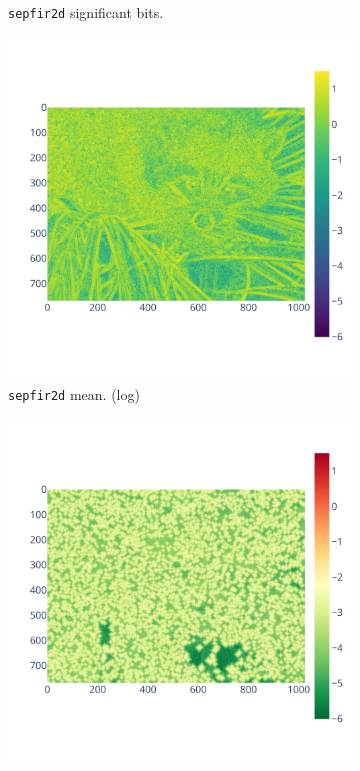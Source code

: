 \documentclass[11pt]{article}
\begin{document}
\begin{figure}
\begin{subfigure}{0.3\linewidth}
    \caption{\centering\texttt{sepfir2d} significant bits. \newline \textcolor{white}{.}}
    \label{fig:bspline_bisplev_sig}
\end{subfigure}
\begin{subfigure}{0.3\linewidth}
    \includegraphics[width=\linewidth]{figure/bspline/bspline_mean_log.pdf}
    \caption{\centering\texttt{sepfir2d} mean. \newline (log)}
    \label{fig:bspline_bisplev_mean}
\end{subfigure}
\begin{subfigure}{0.3\linewidth}
    \includegraphics[width=\linewidth]{figure/bspline/bspline_std_log.pdf}

\end{subfigure}
\end{figure}
\end{document}
